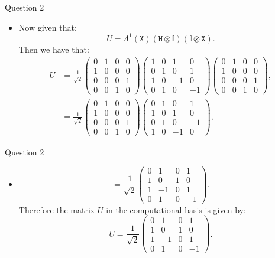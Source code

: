 \documentclass[12pt]{beamer}
\newcommand{\X}{\mathtt{X}}
\newcommand{\HH}{\mathtt{H}}
\newcommand{\I}{\mathbb{I}}
\newcommand{\eqt}[1]
{\begin{equation}#1
\end{equation}}
\newcommand{\eqtt}[1]
{\begin{equation} \begin{split}#1
\end{split}\end{equation}}
\begin{document}
\begin{frame}[allowframebreaks]{Question 2}
	\begin{itemize}
\item Now given that: \eqt{U=\Lambda^1(\X)\left( \HH\otimes\I\right)\left(\I\otimes \X \right).}
Then we have that:
\eqtt{
	U&=\frac{1}{\sqrt{2}}\begin{pmatrix}
		0&1&0&0\\
		1&0&0&0\\
		0&0&0&1\\
		0&0&1&0
	\end{pmatrix}\begin{pmatrix}
		1&0&1&0\\
		0&1&0&1\\
		1&0&-1&0\\
		0&1&0&-1
	\end{pmatrix}\begin{pmatrix}
		0&1&0&0\\
		1&0&0&0\\
		0&0&0&1\\
		0&0&1&0
	\end{pmatrix},\\
	&=\frac{1}{\sqrt{2}}\begin{pmatrix}
		0&1&0&0\\
		1&0&0&0\\
		0&0&0&1\\
		0&0&1&0
	\end{pmatrix}\begin{pmatrix}
		0&1&0&1\\
		1&0&1&0\\
		0&1&0&-1\\
		1&0&-1&0
	\end{pmatrix},}
\end{itemize}
\end{frame}
%
\begin{frame}[allowframebreaks]{Question 2}
	\begin{itemize}
\item \eqt{=\frac{1}{\sqrt{2}}\begin{pmatrix}
		0&1&0&1\\
		1&0&1&0\\
		1&-1&0&1\\
		0&1&0&-1
	\end{pmatrix}.
}
Therefore the matrix $U$ in the computational basis is given by:
\eqt{U=\frac{1}{\sqrt{2}}\begin{pmatrix}
		0&1&0&1\\
		1&0&1&0\\
		1&-1&0&1\\
		0&1&0&-1
	\end{pmatrix}.}
\end{itemize}
\end{frame}
\end{document}
